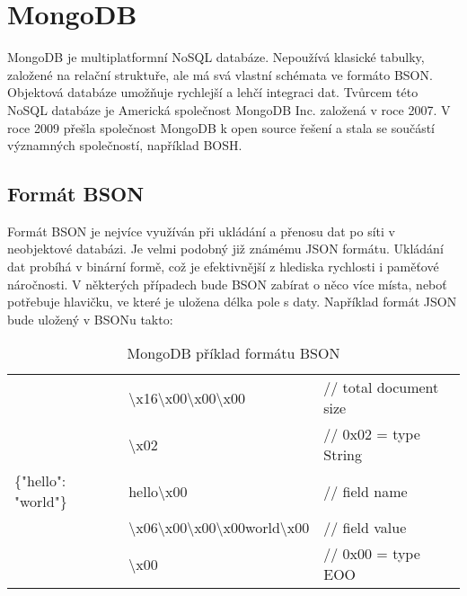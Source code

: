 \section {MongoDB}
\par MongoDB\cite{mongodb} je multiplatformní NoSQL databáze. Nepoužívá klasické tabulky, založené na relační struktuře, ale má svá vlastní schémata ve formáto BSON\cite{mongogbinc}. Objektová databáze umožňuje rychlejší a lehčí integraci dat. Tvůrcem této NoSQL databáze je Americká společnost MongoDB\cite{mongodb} Inc. založená v roce 2007. V roce 2009 přešla společnost MongoDB\cite{mongodb} k open source řešení a stala se součástí významných společností, například BOSH.
\subsection {Formát BSON}
\par Formát BSON\cite{mongogbinc} je nejvíce využíván při ukládání a přenosu dat po síti v neobjektové databázi. Je velmi podobný již známému JSON formátu. Ukládání dat probíhá v binární formě, což je efektivnější z hlediska rychlosti i paměťové náročnosti. V některých případech bude BSON zabírat o něco více místa, neboť potřebuje hlavičku, ve které je uložena délka pole s daty.
Například formát JSON bude uložený v BSON\cite{mongogbinc}u takto: 

\begin{table}[h]
\begin{tabulary}{\textwidth} {| l | l | l |}
 						& \textbackslash{x}16\textbackslash{x}00\textbackslash{x}00\textbackslash{x}00 								&// total document size \\
 						& \textbackslash{x}02 																						&// 0x02 = type String\\
\{"hello": "world"\} 	& hello\textbackslash{x}00 																					&// field name\\
 						& \textbackslash{x}06\textbackslash{x}00\textbackslash{x}00\textbackslash{x}00world\textbackslash{x}00 		&// field value\\
 						& \textbackslash{x}00 																						&// 0x00 = type EOO \\
\end{tabulary}
\caption[MongoDB příklad formátu BSON]{MongoDB příklad formátu BSON}\label{tab:bson}
\end{table}
\vfill